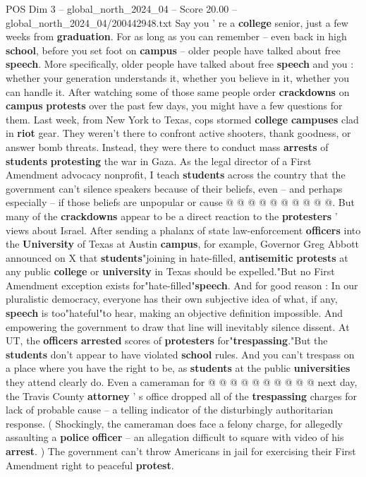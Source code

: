 \begin{textsample}{POS Dim 3 – global\_north\_2024\_04 – Score 20.00 – global\_north\_2024\_04/200442948.txt}  \label{ex:f3_pos_058}
Say you ' re a \textbf{college} senior, just a few weeks from \textbf{graduation}.
For as long as you can remember -- even back in high \textbf{school}, before you set foot on \textbf{campus} -- older people have talked about free \textbf{speech}.
More specifically, older people have talked about free \textbf{speech} and you : whether your generation understands it, whether you believe in it, whether you can handle it.
After watching some of those same people order \textbf{crackdowns} on \textbf{campus} \textbf{protests} over the past few days, you might have a few questions for them.
Last week, from New York to Texas, cops stormed \textbf{college} \textbf{campuses} clad in \textbf{riot} gear.
They weren't there to confront active shooters, thank goodness, or answer bomb threats.
Instead, they were there to conduct mass \textbf{arrests} of \textbf{students} \textbf{protesting} the war in Gaza.
As the legal director of a First Amendment advocacy nonprofit, I teach \textbf{students} across the country that the government can't silence speakers because of their beliefs, even -- and perhaps especially -- if those beliefs are unpopular or cause @ @ @ @ @ @ @ @ @ @.
But many of the \textbf{crackdowns} appear to be a direct reaction to the \textbf{protesters} ' views about Israel.
After sending a phalanx of state law-enforcement \textbf{officers} into the \textbf{University} of Texas at Austin \textbf{campus}, for example, Governor Greg Abbott announced on X that \textbf{students}"joining in hate-filled, \textbf{antisemitic} \textbf{protests} at any public \textbf{college} or \textbf{university} in Texas should be expelled."But no First Amendment exception exists for"hate-filled"\textbf{speech}.
And for good reason : In our pluralistic democracy, everyone has their own subjective idea of what, if any, \textbf{speech} is too"hateful"to hear, making an objective definition impossible.
And empowering the government to draw that line will inevitably silence dissent.
At UT, the \textbf{officers} \textbf{arrested} scores of \textbf{protesters} for"\textbf{trespassing}."But the \textbf{students} don't appear to have violated \textbf{school} rules.
And you can't trespass on a place where you have the right to be, as \textbf{students} at the public \textbf{universities} they attend clearly do.
Even a cameraman for @ @ @ @ @ @ @ @ @ @ next day, the Travis County \textbf{attorney} ' s office dropped all of the \textbf{trespassing} charges for lack of probable cause -- a telling indicator of the disturbingly authoritarian response. ( Shockingly, the cameraman does face a felony charge, for allegedly assaulting a \textbf{police} \textbf{officer} -- an allegation difficult to square with video of his \textbf{arrest}. ) The government can't throw Americans in jail for exercising their First Amendment right to peaceful \textbf{protest}.

\end{textsample}
